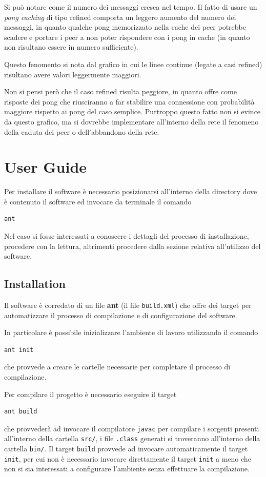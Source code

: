 \documentclass[a4paper,11pt]{article}
\begin{document}
Si pu\`o notare come il numero dei messaggi cresca nel tempo. Il fatto di usare un \emph{pong caching} di tipo refined comporta un leggero aumento del numero dei messaggi, in quanto qualche pong memorizzato nella cache dei peer potrebbe scadere e portare i peer a non poter rispondere con i pong in cache (in quanto non risultano essere in numero sufficiente).

Questo fenomento si nota dal grafico in cui le linee continue (legate a casi refined) risultano avere valori leggermente maggiori. 

Non si pensi per\`o che il caso refined risulta peggiore, in quanto offre come risposte dei pong che riusciranno a far stabilire una connessione con probabilit\`a maggiore rispetto ai pong del caso semplice. Purtroppo questo fatto non si evince da questo grafico, ma si dovrebbe implementare all'interno della rete il fenomeno della caduta dei peer o dell'abbandono della rete.

\section{User Guide}
\label{sec:userguide}

Per installare il software \`e necessario posizionarsi all'interno della directory dove \`e contenuto il software ed invocare da terminale il comando
\begin{lstlisting}
ant
\end{lstlisting}

Nel caso si fosse interessati a conoscere i dettagli del processo di installazione, procedere con la lettura, altrimenti procedere dalla sezione relativa all'utilizzo del software.

\subsection{Installation}

Il software \`e corredato di un file \textbf{ant} (il file \texttt{build.xml}) che offre dei target per automatizzare il processo di compilazione e di configurazione del software.

In particolare \`e possibile inizializzare l'ambiente di lavoro utilizzando il comando
\begin{lstlisting}
ant init
\end{lstlisting}
che provvede a creare le cartelle necessarie per completare il processo di compilazione.

Per compilare il progetto \`e necessario eseguire il target 
\begin{lstlisting}
ant build
\end{lstlisting}
che provveder\`a ad invocare il compilatore \texttt{javac} per compilare i sorgenti presenti all'interno della cartella \texttt{src/}, i file \texttt{.class} generati si troveranno all'interno della cartella \texttt{bin/}. Il target \texttt{build} provvede ad invocare automaticamente il target \texttt{init}, per cui non \`e necessario invocare direttamente il target \texttt{init} a meno che non si sia interessati a configurare l'ambiente senza effettuare la compilazione.
\end{document}
